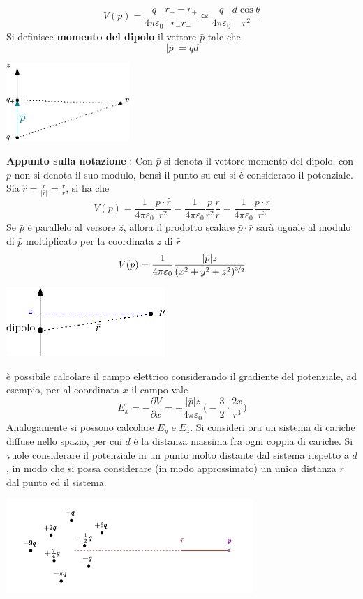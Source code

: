 \documentclass[10pt, letterpaper]{report}
\begin{document}
$$ V(p)=\frac{q}{4\pi\varepsilon_0}\frac{r_- - r_+}{r_-r_+} \simeq 
\frac{q}{4\pi\varepsilon_0}\frac{d\cos\theta}{r^2}$$
Si definisce \textbf{momento del dipolo} il vettore $\bar p$ tale che $$ |\bar p|=qd$$
\begin{center}
    \includegraphics[width=0.35\textwidth]{images/momentoDipolo.eps}
\end{center} 
\textbf{Appunto sulla notazione} : Con $\bar p$ si denota il vettore momento del dipolo, con $p$ non si denota il suo modulo, bensì il punto su cui si è considerato il potenziale.\acc
Sia $\hat r = \frac{\bar r}{|\bar r|}=\frac{\bar r}{r}$, si ha che 
$$V(p)=\frac{1}{4\pi \varepsilon_0} \frac{\bar p \cdot \hat r}{r^2}= 
\frac{1}{4\pi \varepsilon_0} \frac{\bar p }{r^2}\frac{\bar r}{r}=
\frac{1}{4\pi \varepsilon_0} \frac{\bar p \cdot \bar  r}{r^3}$$
Se $\bar p$ è parallelo al versore $\hat z$, allora il prodotto scalare $\bar p \cdot \bar r$ sarà uguale al modulo di $\bar p$ moltiplicato per la coordinata $z$ di $\bar r$ 
$$V(p)=\frac{1}{4\pi \varepsilon_0} \frac{|\bar p|z}{(x^2+y^2+z^2)^{\nicefrac{3}{2}}}$$
\begin{center}
    \includegraphics[width=0.45\textwidth]{images/MomentoDipolo2.eps}
\end{center} 
è possibile calcolare il campo elettrico considerando il gradiente del potenziale, ad esempio, per al coordinata $x$ il campo vale 
$$ E_x=-\frac{\partial V}{\partial x}= 
-\frac{|\bar p|z}{4\pi\varepsilon_0}\Big( -\frac{3}{2}\cdot \frac{2x}{r^3} \Big)
$$
Analogamente si possono calcolare $E_y$ e $E_z$.\acc 
Si consideri ora un sistema di cariche diffuse nello spazio, per cui $d$ è la distanza massima fra ogni coppia di cariche. Si vuole considerare il potenziale in un punto molto distante dal sistema rispetto a $d$, in modo che si possa considerare (in modo approssimato) un unica distanza $r$ dal punto ed il sistema. 
\begin{center}
    \includegraphics[width=0.7\textwidth]{images/sistemaCariche.pdf}
\end{center} 
\end{document}
